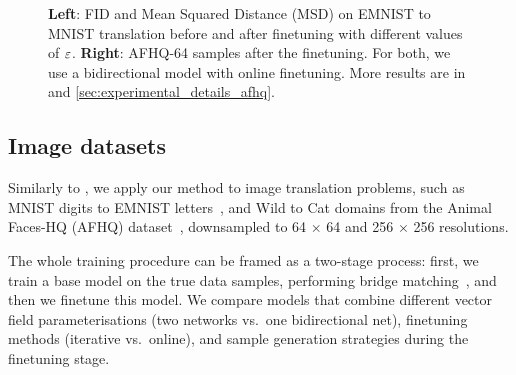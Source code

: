 \documentclass{article}
\begin{document}
\begin{figure}[htbp]
    \centering 
    \hfill
    \hfill
    \caption{\textbf{Left}: FID and Mean Squared Distance (MSD) on EMNIST to MNIST translation before and after finetuning with different values of $\varepsilon$. \textbf{Right}: AFHQ-64 samples after the finetuning.  For both, we use a bidirectional model with online finetuning. More results are in  and \ref{sec:experimental_details_afhq}.} 
    \label{fig:mnist_sigma_sweep_bars}
\end{figure}


\subsection{Image datasets}
\label{sec:image_xps}

Similarly to \cite{shi2023DSBM}, we apply our method to image translation problems, such as MNIST digits to EMNIST letters~\citep{mnist, cohen2017emnist}, and Wild to Cat domains from the Animal Faces-HQ (AFHQ) dataset~\citep{choi2020starganv2}, downsampled to 64 $\times$ 64 and 256 $\times$ 256 resolutions. 

The whole training procedure can be framed as a two-stage process: first, we train a base model on the true data samples, performing bridge matching~\citep{peluchettinon,albergo_building_2023,lipman_flow_2022,liu2023I2SB}, and then we finetune this model. 
We compare models that combine different vector field parameterisations (two networks vs.~one bidirectional net), finetuning methods (iterative vs.~online), and sample generation strategies during the finetuning stage. 
\end{document}
